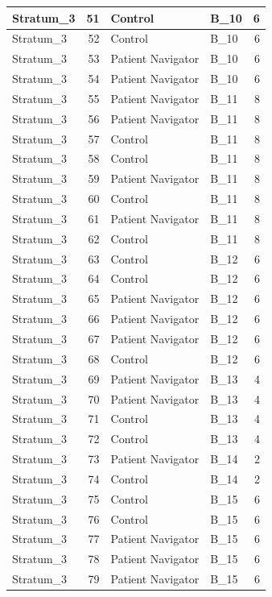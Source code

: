 \documentclass[
]{book}
\begin{document}
\begin{table}[H]
\begin{tabular}{l|r|l|l|r}
\hline
Stratum\_3 & 51 & Control & B\_10 & 6\\
\hline
Stratum\_3 & 52 & Control & B\_10 & 6\\
\hline
Stratum\_3 & 53 & Patient Navigator & B\_10 & 6\\
\hline
Stratum\_3 & 54 & Patient Navigator & B\_10 & 6\\
\hline
Stratum\_3 & 55 & Patient Navigator & B\_11 & 8\\
\hline
Stratum\_3 & 56 & Patient Navigator & B\_11 & 8\\
\hline
Stratum\_3 & 57 & Control & B\_11 & 8\\
\hline
Stratum\_3 & 58 & Control & B\_11 & 8\\
\hline
Stratum\_3 & 59 & Patient Navigator & B\_11 & 8\\
\hline
Stratum\_3 & 60 & Control & B\_11 & 8\\
\hline
Stratum\_3 & 61 & Patient Navigator & B\_11 & 8\\
\hline
Stratum\_3 & 62 & Control & B\_11 & 8\\
\hline
Stratum\_3 & 63 & Control & B\_12 & 6\\
\hline
Stratum\_3 & 64 & Control & B\_12 & 6\\
\hline
Stratum\_3 & 65 & Patient Navigator & B\_12 & 6\\
\hline
Stratum\_3 & 66 & Patient Navigator & B\_12 & 6\\
\hline
Stratum\_3 & 67 & Patient Navigator & B\_12 & 6\\
\hline
Stratum\_3 & 68 & Control & B\_12 & 6\\
\hline
Stratum\_3 & 69 & Patient Navigator & B\_13 & 4\\
\hline
Stratum\_3 & 70 & Patient Navigator & B\_13 & 4\\
\hline
Stratum\_3 & 71 & Control & B\_13 & 4\\
\hline
Stratum\_3 & 72 & Control & B\_13 & 4\\
\hline
Stratum\_3 & 73 & Patient Navigator & B\_14 & 2\\
\hline
Stratum\_3 & 74 & Control & B\_14 & 2\\
\hline
Stratum\_3 & 75 & Control & B\_15 & 6\\
\hline
Stratum\_3 & 76 & Control & B\_15 & 6\\
\hline
Stratum\_3 & 77 & Patient Navigator & B\_15 & 6\\
\hline
Stratum\_3 & 78 & Patient Navigator & B\_15 & 6\\
\hline
Stratum\_3 & 79 & Patient Navigator & B\_15 & 6\\

\end{tabular}
\end{table}
\end{document}
